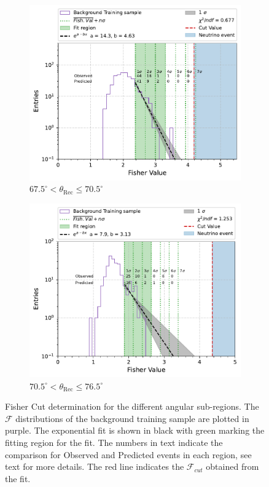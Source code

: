 \begin{figure}[h!]
    \begin{subfigure}[r]{.48\textwidth}
      \centering
      \includegraphics[width=\linewidth]{thesis_figures/Nu_analysis/Fisher_plots/Fisher_fit_region_67.5_70.5.pdf}
      \caption{$ 67.5^{\circ} <\theta_{\text{Rec}} \leq 70.5^{\circ}$}
    \end{subfigure}
    \hfill    
    \begin{subfigure}[r]{.48\textwidth}
      \centering
      \includegraphics[width=\linewidth]{thesis_figures/Nu_analysis/Fisher_plots/Fisher_fit_region_70.5_73.5.pdf}
      \caption{$ 70.5^{\circ} <\theta_{\text{Rec}} \leq 76.5^{\circ}$}
   \end{subfigure}
   \caption{Fisher Cut determination for the different angular sub-regions. The $\mathcal{F}$ distributions of the background training sample are plotted in purple. The exponential fit is shown in black with green marking the fitting region for the fit. The numbers in text indicate the comparison for Observed and Predicted events in each region, see text for more details. The red line indicates the $\mathcal{F}_{cut}$ obtained from the fit.}
    \label{fig:Fisher_cut}

\end{figure}

